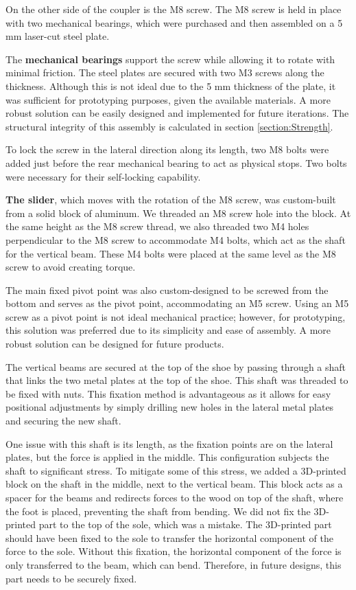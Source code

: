 \documentclass[lettersize,journal]{IEEEtran}
\begin{document}
On the other side of the coupler is the M8 screw. The M8 screw is held in place with two mechanical bearings, which were purchased and then assembled on a 5 mm laser-cut steel plate.

The \textbf{mechanical bearings} support the screw while allowing it to rotate with minimal friction. The steel plates are secured with two M3 screws along the thickness. Although this is not ideal due to the 5 mm thickness of the plate, it was sufficient for prototyping purposes, given the available materials. A more robust solution can be easily designed and implemented for future iterations. The structural integrity of this assembly is calculated in section \ref{section:Strength}.

To lock the screw in the lateral direction along its length, two M8 bolts were added just before the rear mechanical bearing to act as physical stops. Two bolts were necessary for their self-locking capability.

\textbf{The slider}, which moves with the rotation of the M8 screw, was custom-built from a solid block of aluminum. We threaded an M8 screw hole into the block. At the same height as the M8 screw thread, we also threaded two M4 holes perpendicular to the M8 screw to accommodate M4 bolts, which act as the shaft for the vertical beam. These M4 bolts were placed at the same level as the M8 screw to avoid creating torque.

The main fixed pivot point was also custom-designed to be screwed from the bottom and serves as the pivot point, accommodating an M5 screw. Using an M5 screw as a pivot point is not ideal mechanical practice; however, for prototyping, this solution was preferred due to its simplicity and ease of assembly. A more robust solution can be designed for future products.

The vertical beams are secured at the top of the shoe by passing through a shaft that links the two metal plates at the top of the shoe. This shaft was threaded to be fixed with nuts. This fixation method is advantageous as it allows for easy positional adjustments by simply drilling new holes in the lateral metal plates and securing the new shaft.

One issue with this shaft is its length, as the fixation points are on the lateral plates, but the force is applied in the middle. This configuration subjects the shaft to significant stress. To mitigate some of this stress, we added a 3D-printed block on the shaft in the middle, next to the vertical beam. This block acts as a spacer for the beams and redirects forces to the wood on top of the shaft, where the foot is placed, preventing the shaft from bending. We did not fix the 3D-printed part to the top of the sole, which was a mistake. The 3D-printed part should have been fixed to the sole to transfer the horizontal component of the force to the sole. Without this fixation, the horizontal component of the force is only transferred to the beam, which can bend. Therefore, in future designs, this part needs to be securely fixed.
\end{document}
